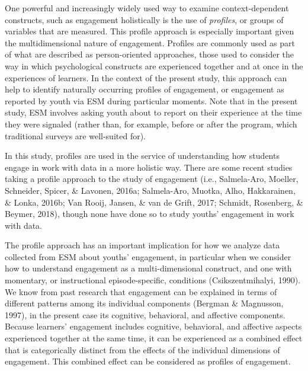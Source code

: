 \documentclass[]{book}
\theoremstyle{definition}
\theoremstyle{definition}
\theoremstyle{definition}
\theoremstyle{remark}
\begin{document}
One powerful and increasingly widely used way to examine
context-dependent constructs, such as engagement holistically is the use
of \emph{profiles}, or groups of variables that are measured. This
profile approach is especially important given the multidimensional
nature of engagement. Profiles are commonly used as part of what are
described as person-oriented approaches, those used to consider the way
in which psychological constructs are experienced together and at once
in the experiences of learners. In the context of the present study,
this approach can help to identify naturally occurring profiles of
engagement, or engagement as reported by youth via ESM during particular
moments. Note that in the present study, ESM involves asking youth about
to report on their experience at the time they were signaled (rather
than, for example, before or after the program, which traditional
surveys are well-suited for).

In this study, profiles are used in the service of understanding how
students engage in work with data in a more holistic way. There are some
recent studies taking a profile approach to the study of engagement
(i.e., Salmela-Aro, Moeller, Schneider, Spicer, \& Lavonen, 2016a;
Salmela-Aro, Muotka, Alho, Hakkarainen, \& Lonka, 2016b; Van Rooij,
Jansen, \& van de Grift, 2017; Schmidt, Rosenberg, \& Beymer, 2018),
though none have done so to study youths' engagement in work with data.

The profile approach has an important implication for how we analyze
data collected from ESM about youths' engagement, in particular when we
consider how to understand engagement as a multi-dimensional construct,
and one with momentary, or instructional episode-specific, conditions
(Csikszentmihalyi, 1990). We know from past research that engagement can
be explained in terms of different patterns among its individual
components (Bergman \& Magnusson, 1997), in the present case its
cognitive, behavioral, and affective components. Because learners'
engagement includes cognitive, behavioral, and affective aspects
experienced together at the same time, it can be experienced as a
combined effect that is categorically distinct from the effects of the
individual dimensions of engagement. This combined effect can be
considered as profiles of engagement.
\end{document}
